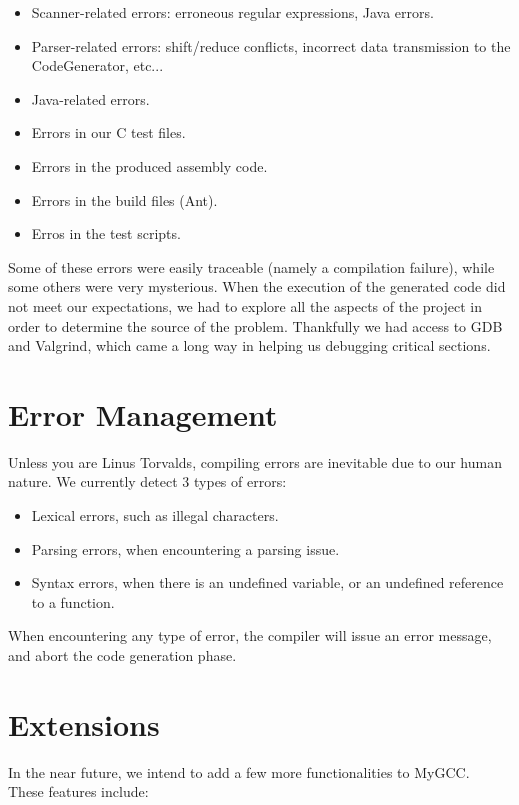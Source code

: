 \documentclass{article}
\begin{document}
\begin{itemize}
\item Scanner-related errors: erroneous regular expressions, Java errors.
\item Parser-related errors: shift/reduce conflicts, incorrect data transmission to the CodeGenerator, etc...
\item Java-related errors.
\item Errors in our C test files.
\item Errors in the produced assembly code.
\item Errors in the build files (Ant).
\item Erros in the test scripts.
\end{itemize}

Some of these errors were easily traceable (namely a compilation failure), while some others were very mysterious. When the execution of the generated code did not meet our expectations, we had to explore all the aspects of the project in order to determine the source of the problem. Thankfully we had access to GDB and Valgrind, which came a long way in helping us debugging critical sections.\\


\section{Error Management}
Unless you are Linus Torvalds, compiling errors are inevitable due to our human nature. We currently detect 3 types of errors:

\begin{itemize}
\item Lexical errors, such as illegal characters.
\item Parsing errors, when encountering a parsing issue.
\item Syntax errors, when there is an undefined variable, or an undefined reference to a function.
\end{itemize}

When encountering any type of error, the compiler will issue an error message, and abort the code generation phase.

\section{Extensions}
In the near future, we intend to add a few more functionalities to MyGCC.\\
These features include:
\end{document}
